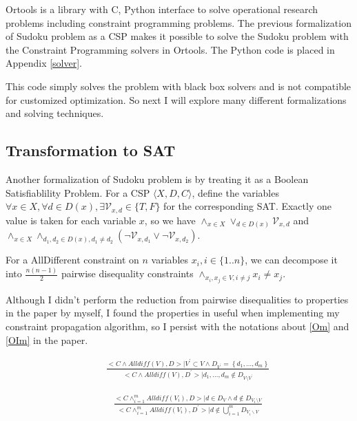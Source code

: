 \documentclass[a4paper, 12pt]{report}
\begin{document}
            Ortools is a library with C, Python interface to solve operational research problems including constraint programming problems. The previous formalization of Sudoku problem as a CSP makes it possible to solve the Sudoku problem with the Constraint Programming solvers in Ortools. The Python code is placed in Appendix \ref{solver}.

            This code simply solves the problem with black box solvers and is not compatible for customized optimization. So next I will explore many different formalizations and solving techniques.

        \subsection {Transformation to SAT}
            Another formalization of Sudoku problem is by treating it as a Boolean Satisfiablility Problem\cite{lardeux2008overlapping, lynce2006sudoku}. For a CSP $\langle X,D,C\rangle$, define the variables $\forall x\in X, \forall d\in D(x), \exists\mathcal V_{x,d}\in \{T,F\}$ for the corresponding SAT. Exactly one value is taken for each variable $x$, so we have $\land_{x\in X}\vee_{d\in D(x)} \mathcal V_{x,d}$ and $\land_{x\in X}\land_{d_1,d_2\in
            D(x),d_1\neq d_2}(\neg \mathcal V_{x,d_1} \vee \neg \mathcal V_{x,d_2})$.

            For a AllDifferent constraint on $n$ variables $x_i, i\in \{1..n\}$, we can decompose it into $\frac{n(n-1)}{2}$ pairwise disequality constraints $\land_{x_i,x_j\in V, i\neq j} x_i\neq x_j$.

            Although I didn't perform the reduction from pairwise disequalities to properties in the paper by myself, I found the properties in \cite{lardeux2008overlapping} useful when implementing my constraint propagation algorithm, so I persist with the notations about \ref{Om} and \ref{OIm} in the paper\cite{lardeux2008overlapping}.

            \begin{align}
                & \quad \frac{<C \wedge Alldiff(V), D>| V^{\prime} \subset V \wedge D_{V^{\prime}}=\left\{d_{1}, \ldots, d_{m}\right\}}{<C \wedge Alldiff(V), D^{\prime}>| d_{1}, \ldots, d_{m} \notin D_{V \setminus V^{\prime}}}
                \label{Om}
                \tag{Om}
            \end{align}

            \begin{align}
                & \quad \frac{<C \wedge_{i=1}^{m} Alldiff(V_{i}), D>| d \in D_{V} \wedge d \notin D_{V_{1} \setminus V}}{<C \wedge_{i=1}^{m} Alldiff(V_{i}), D^{\prime}>| d \notin \bigcup_{i=1}^{m} D_{V_{i} \backslash V}}
                \label{OIm}
                \tag{OIm}
            \end{align}
\end{document}
